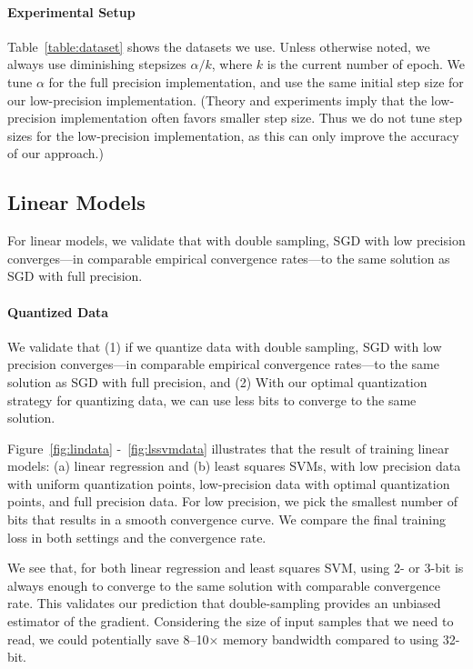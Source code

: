 \documentclass{article}
\begin{document}
\paragraph{Experimental Setup} 
Table~\ref{table:dataset} shows the 
datasets we use. 
Unless otherwise noted, we always
use diminishing stepsizes $\alpha/k$,
where $k$ is the current number of
epoch. We tune 
$\alpha$ for the full precision
implementation, and use the
same initial step size for 
our low-precision 
implementation. (Theory and
experiments imply that the low-precision
implementation often favors smaller step size. 
Thus we do not tune step sizes for the low-precision 
implementation, as this can only improve the accuracy of our approach.) 

\subsection{Linear Models}

For linear models, we validate that with double sampling, SGD with low
precision converges---in comparable empirical 
convergence rates---to the same solution
as SGD with full precision.

\paragraph{Quantized Data}
We validate that (1) if we quantize data with double sampling, SGD with low precision converges---in comparable empirical 
convergence rates---to the same solution as SGD with full precision, and (2) With our optimal quantization strategy for quantizing data, we can use less bits to converge to the same solution.

Figure~\ref{fig:lindata} -~\ref{fig:lssvmdata} illustrates that the result of training linear models:
(a) linear regression and (b) least squares SVMs,
with low precision data with uniform quantization points, low-precision data with optimal quantization points, and 
full precision data. For low precision, we pick the 
smallest number of bits that results in a smooth convergence
curve. We compare the final training loss in both settings and the convergence rate.


We see that, for both linear regression 
and least squares SVM,
using 2- or 3-bit is always enough
to converge to the same solution
with comparable convergence rate. 
This validates our prediction that
double-sampling provides an
unbiased estimator of the gradient.
Considering the size of input
samples that we need to read, we
could potentially save 8--10$\times$ 
memory bandwidth compared to using 
32-bit. 
\end{document}
